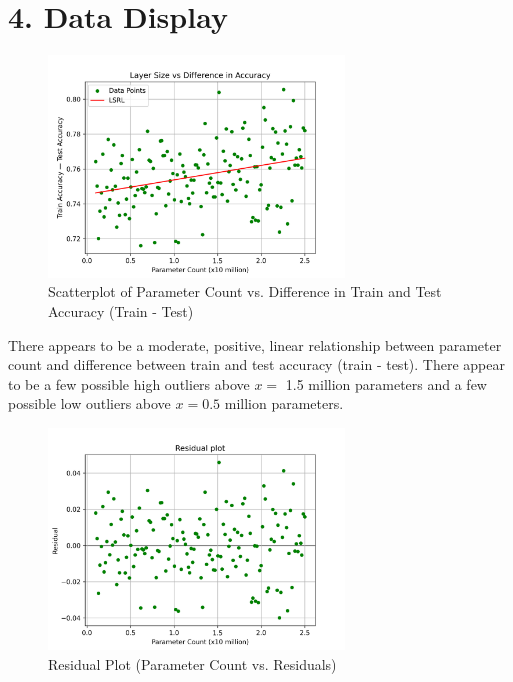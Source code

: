 \documentclass[12pt]{article}
\begin{document}
    \section*{4. Data Display}
    \begin{figure}[H]
        \centering
        \includegraphics[width=0.7\textwidth]{Images/Scatter}
        \caption{Scatterplot of Parameter Count vs. Difference in Train and Test Accuracy (Train - Test)}
        \label{fig:scatterplot}
    \end{figure}
    There appears to be a moderate, positive, linear relationship between parameter count and difference between
    train and test accuracy (train - test). There appear to be a few possible high outliers above $x =$ 1.5 million parameters
    and a few possible low outliers above $x = 0.5$ million parameters.
    \begin{figure}[H]
        \centering
        \includegraphics[width=0.7\textwidth]{Images/Resid}
        \caption{Residual Plot (Parameter Count vs. Residuals)}
        \label{fig:residuals}
    \end{figure}
\end{document}
